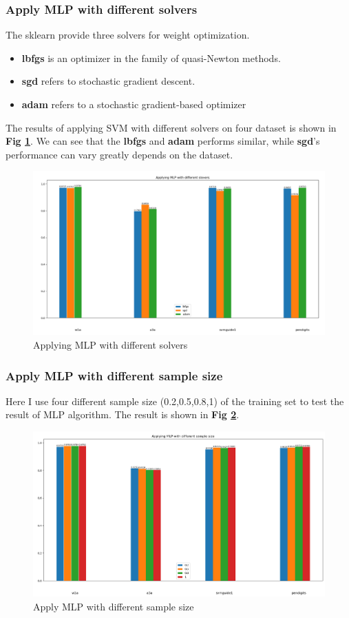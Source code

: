 \documentclass{article}
\theoremstyle{definition}
\numberwithin{equation}{section}
\numberwithin{figure}{section}
\begin{document}
\subsubsection{Apply MLP with different solvers}
The sklearn provide three solvers for weight optimization.
\begin{itemize}
\item \textbf{lbfgs} is an optimizer in the family of quasi-Newton methods.
\item \textbf{sgd} refers to stochastic gradient descent.
\item \textbf{adam} refers to a stochastic gradient-based optimizer 
\end{itemize}
The results of applying SVM with different solvers on four dataset is shown in \textbf{Fig \ref{slover}}. We can see that the \textbf{lbfgs} and \textbf{adam} performs similar, while \textbf{sgd}'s performance can vary greatly depends on the dataset.
\begin{figure}[htbp]
  	\centering
  	\includegraphics[width=12cm]{fig/slover.png}
  \caption{Applying MLP with different solvers}
  \label{slover}
  \end{figure}
\subsubsection{Apply MLP with different sample size}
Here I use four different sample size (0.2,0.5,0.8,1) of the training set to test the result of MLP algorithm. The result is shown in \textbf{Fig \ref{size}}.
\begin{figure}[htbp]
  	\centering
  	\includegraphics[width=12cm]{fig/size.png}
  \caption{Apply MLP with different sample size}
  \label{size}
  \end{figure}
\end{document}
